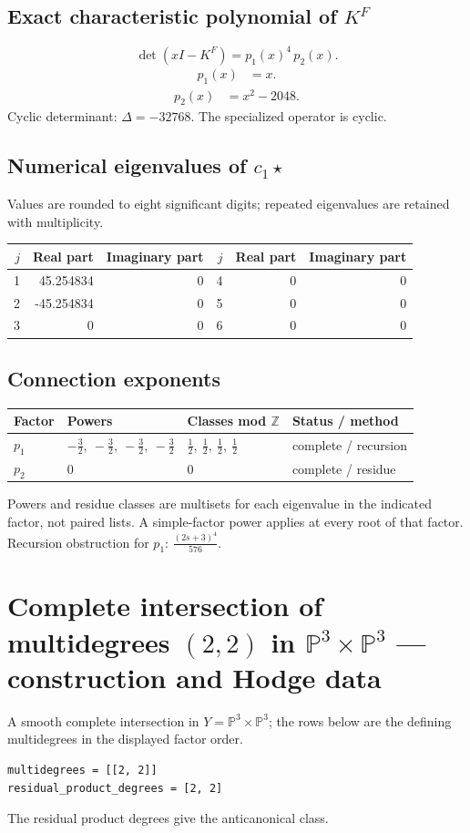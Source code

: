 \documentclass[10pt,a4paper]{article}
\begin{document}
\subsection*{Exact characteristic polynomial of $K^F$}
\[\det(xI-K^F)=p_{1}(x)^{4}\,p_{2}(x).\]
\[\begin{aligned}p_{1}(x)&=x.\end{aligned}\]
\[\begin{aligned}p_{2}(x)&=x^{2} - 2048.\end{aligned}\]
Cyclic determinant: $\Delta=-32768$. The specialized operator is cyclic.
\subsection*{Numerical eigenvalues of $c_1\star$}
Values are rounded to eight significant digits; repeated eigenvalues are retained with multiplicity.
\begin{center}\small\begin{tabular}{rrr@{\qquad}rrr}\toprule $j$ & Real part & Imaginary part & $j$ & Real part & Imaginary part\\\midrule
1 & 45.254834 & 0 & 4 & 0 & 0\\
2 & -45.254834 & 0 & 5 & 0 & 0\\
3 & 0 & 0 & 6 & 0 & 0\\
\bottomrule\end{tabular}\end{center}
\subsection*{Connection exponents}
\begin{center}\begin{tabular}{llll}\toprule Factor & Powers & Classes mod $\mathbb Z$ & Status / method\\\midrule
$p_{1}$ & $- \frac{3}{2},\ - \frac{3}{2},\ - \frac{3}{2},\ - \frac{3}{2}$ & $\frac{1}{2},\ \frac{1}{2},\ \frac{1}{2},\ \frac{1}{2}$ & complete / recursion\\
$p_{2}$ & $0$ & $0$ & complete / residue\\
\bottomrule\end{tabular}\end{center}
Powers and residue classes are multisets for each eigenvalue in the indicated factor, not paired lists. A simple-factor power applies at every root of that factor.
Recursion obstruction for $p_{1}$: $\frac{\left(2 s + 3\right)^{4}}{576}$.
\clearpage\section*{Complete intersection of multidegrees $(2,2)$ in $\mathbb P^{3}\times \mathbb P^{3}$ --- construction and Hodge data}\label{entry:PROD5-B01}
A smooth complete intersection in $Y=\mathbb P^{3}\times\mathbb P^{3}$; the rows below are the defining multidegrees in the displayed factor order.
\begin{lstlisting}
multidegrees = [[2, 2]]
residual_product_degrees = [2, 2]
\end{lstlisting}
The residual product degrees give the anticanonical class.
\end{document}
